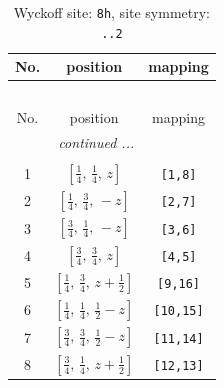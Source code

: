 \documentclass[fleqn,8pt]{jsarticle}
\begin{document}
\begin{longtable}{ccc}
\caption{Wyckoff site: {\tt 8h}, site symmetry: {\tt ..2}}
 \\
 \hline \hline
No. & position & mapping \\ \hline \endfirsthead

\multicolumn{2}{l}{\tablename\ \thetable{}} \\
 \hline \hline
No. & position & mapping \\ \hline \endhead

 \hline \hline
\multicolumn{2}{r}{\footnotesize\it continued ...} \\ \endfoot

 \hline \hline
\multicolumn{2}{r}{} \\ \endlastfoot

1 & $\left[ \frac{1}{4},\, \frac{1}{4},\, z \right]$ & {\tt [1,8]} \\ \hline
2 & $\left[ \frac{1}{4},\, \frac{3}{4},\, - z \right]$ & {\tt [2,7]} \\ \hline
3 & $\left[ \frac{3}{4},\, \frac{1}{4},\, - z \right]$ & {\tt [3,6]} \\ \hline
4 & $\left[ \frac{3}{4},\, \frac{3}{4},\, z \right]$ & {\tt [4,5]} \\ \hline
5 & $\left[ \frac{1}{4},\, \frac{3}{4},\, z + \frac{1}{2} \right]$ & {\tt [9,16]} \\ \hline
6 & $\left[ \frac{1}{4},\, \frac{1}{4},\, \frac{1}{2} - z \right]$ & {\tt [10,15]} \\ \hline
7 & $\left[ \frac{3}{4},\, \frac{3}{4},\, \frac{1}{2} - z \right]$ & {\tt [11,14]} \\ \hline
8 & $\left[ \frac{3}{4},\, \frac{1}{4},\, z + \frac{1}{2} \right]$ & {\tt [12,13]} \\
\end{longtable}
\renewcommand{\arraystretch}{1.2}
\end{document}

